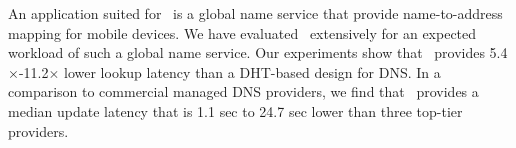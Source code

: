 An application suited for \auspice\ is a global name service that provide name-to-address mapping for mobile devices. We have evaluated \auspice\ extensively for an expected workload of such a global name service. Our experiments show that \auspice\ provides  5.4$\times$-11.2$\times$ lower lookup latency than a DHT-based design for DNS. In a comparison to commercial managed DNS providers, we find that \auspice\ 
provides a median update latency that is 1.1 sec to 24.7 sec lower than three top-tier providers.
